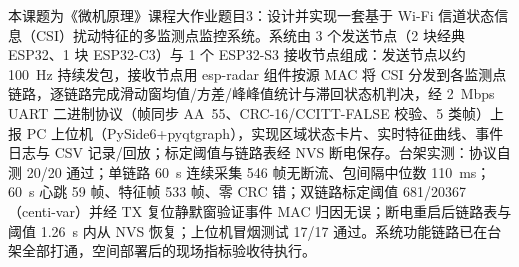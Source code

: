 \begin{chineseabstract}

本课题为《微机原理》课程大作业题目3：设计并实现一套基于 Wi-Fi 信道状态信息（CSI）扰动特征的多监测点监控系统。系统由 3 个发送节点（2 块经典 ESP32、1 块 ESP32-C3）与 1 个 ESP32-S3 接收节点组成：发送节点以约 100~Hz 持续发包，接收节点用 esp-radar 组件按源 MAC 将 CSI 分发到各监测点链路，逐链路完成滑动窗均值/方差/峰峰值统计与滞回状态机判决，经 2~Mbps UART 二进制协议（帧同步 AA~55、CRC-16/CCITT-FALSE 校验、5 类帧）上报 PC 上位机（PySide6+pyqtgraph），实现区域状态卡片、实时特征曲线、事件日志与 CSV 记录/回放；标定阈值与链路表经 NVS 断电保存。台架实测：协议自测 20/20 通过；单链路 60~s 连续采集 546 帧无断流、包间隔中位数 110~ms；60~s 心跳 59 帧、特征帧 533 帧、零 CRC 错；双链路标定阈值 681/20367（centi-var）并经 TX 复位静默窗验证事件 MAC 归因无误；断电重启后链路表与阈值 1.26~s 内从 NVS 恢复；上位机冒烟测试 17/17 通过。系统功能链路已在台架全部打通，空间部署后的现场指标验收待执行。


\end{chineseabstract}
